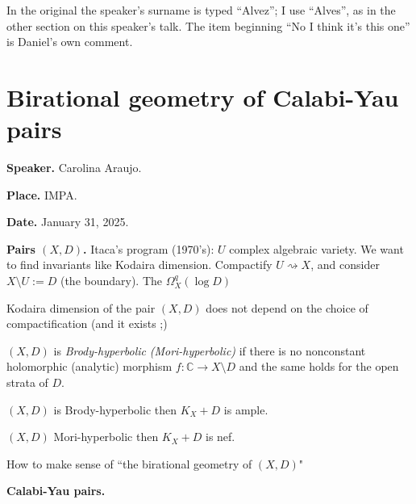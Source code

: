 \medskip{} In the
original the speaker's surname is typed
``Alvez''; I use ``Alves'', as in the other
section on this speaker's talk. The item
beginning ``No I think it's this one'' is
Daniel's own comment.

\section{Birational geometry of Calabi-Yau
pairs}
\label{section-calabi-yau-pairs}

\medskip\noindent
\textbf{Speaker.}
Carolina Araujo.

\medskip\noindent
\textbf{Place.}
IMPA.

\medskip\noindent
\textbf{Date.}
January 31, 2025.

\vspace{2em}
\medskip\noindent
\textbf{Pairs $(X,D)$.}
Itaca's program (1970's): $U$ complex
algebraic variety. We want to find invariants
like Kodaira dimension. Compactify $U
\rightsquigarrow X$, and consider
$X\setminus U:=D$ (the boundary). The
$\Omega^q_X(\operatorname{log}D)$

\begin{theorem}[Itaca, 1977]\leavevmode
Kodaira dimension of the pair $(X,D)$ does
not depend on the choice of compactification
(and it exists ;)
\end{theorem}

\begin{definition}[Lu-Zhang, 2017]\leavevmode
$(X,D)$ is
{\it Brody-hyperbolic}
{\it (Mori-hyperbolic)} if there
is no nonconstant holomorphic (analytic)
morphism  $f:\mathbb{C} \to X\setminus D$
and the same holds for the open strata of
$D$.
\end{definition}

\begin{remark}
$(X,D)$ is Brody-hyperbolic then $K_X +
D$ is ample.
\end{remark}

\begin{theorem}[Sraldi, 2019]\leavevmode
$(X,D)$ Mori-hyperbolic then $K_X+D$ is
nef.
\end{theorem}

\begin{remark}\leavevmode
How to make sense of ``the birational
geometry of $(X,D)$"
\end{remark}

\medskip\noindent
\textbf{Calabi-Yau pairs.}

